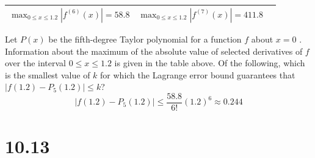 \documentclass[12pt]{article}
\begin{document}
\begin{enumerate}
\begin{table}[h]
\begin{tabular}{|l|l|l|}
					$\displaystyle\max_{0 \leq x \leq 1.2} |f^{(6)}(x)| = 58.8$ &   
					$\displaystyle \max_{0 \leq x \leq 1.2} |f^{(7)}(x)| = 411.8$ \\ [0.2cm] 
					\hline
	      		\end{tabular}
	      \end{table}
Let $P(x)$ be the fifth-degree Taylor polynomial for a function $f$ about $x=0$ . Information about the maximum of the absolute value of selected derivatives of $f$  over the interval $0 \leq x \leq 1.2$ is given in the table above. Of the following, which is the smallest value of $k$ for which the Lagrange error bound guarantees that $|f(1.2)-P_{5}(1.2)| \leq k$?
$$\left|f(1.2)- P_{5}(1.2)\right| \leq \frac{58.8}{6!}(1.2)^{6} \approx \boxed{0.244}$$
\end{enumerate}    
\section*{10.13}
\end{document}
